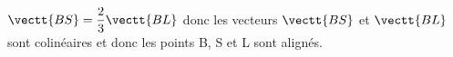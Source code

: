 \begin{enumerate}
\begin{enumerate}
$\vectt{BS} = \dfrac{2}{3} \vectt{BL}$ donc les vecteurs $\vectt{BS}$ et $\vectt{BL}$ sont colinéaires et donc les points B, S et L sont alignés.

		\end{enumerate}
	\end{enumerate}

